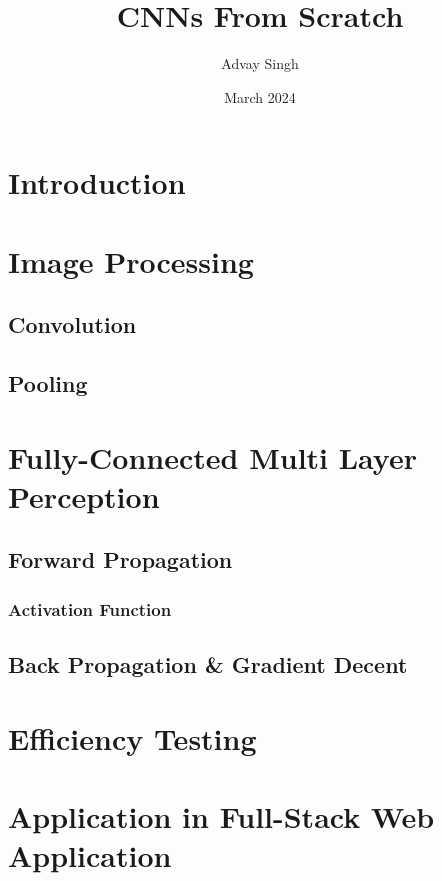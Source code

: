 \documentclass[11pt,letterpaper]{amsbook}
\title{CNNs From Scratch}
\author{Advay Singh}
\date{March 2024}
\theoremstyle{definition}
\numberwithin{definition}{chapter}
\numberwithin{exercise}{chapter}
\numberwithin{section}{chapter}
\begin{document}
\maketitle

\section{Introduction}

\section{Image Processing}

\subsection{Convolution}

\subsection{Pooling}

\section{Fully-Connected Multi Layer Perception}

\subsection{Forward Propagation}

\subsubsection{Activation Function}

\subsection{Back Propagation \& Gradient Decent}

\section{Efficiency Testing}

\section{Application in Full-Stack Web Application}
\end{document}
